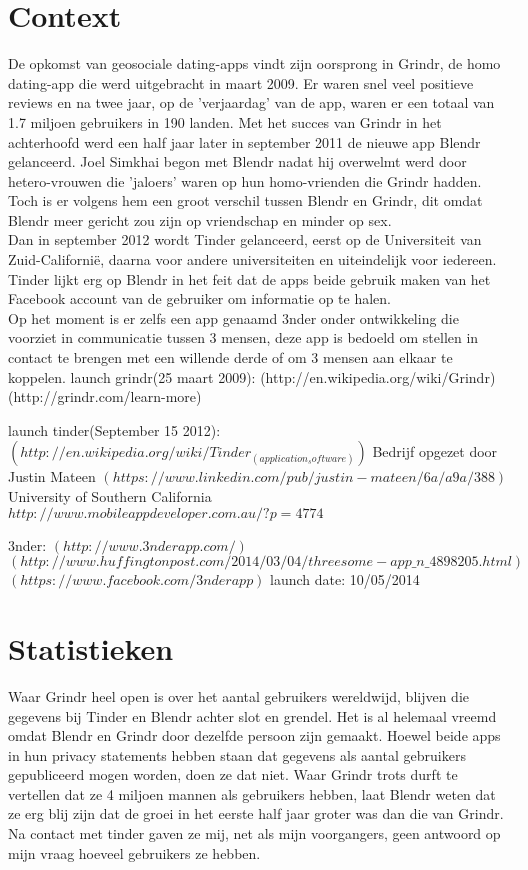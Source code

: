 \documentclass[pdftex,12pt,a4paper]{article}
\begin{document}


\section{Context}
De opkomst van geosociale dating-apps vindt zijn oorsprong in Grindr, de homo dating-app die werd uitgebracht in maart 2009. Er waren snel veel positieve reviews en na twee jaar, op de 'verjaardag' van de app, waren er een totaal van 1.7 miljoen gebruikers in 190 landen. Met het succes van Grindr in het achterhoofd werd een half jaar later in september 2011 de nieuwe app Blendr gelanceerd. Joel Simkhai begon met Blendr nadat hij overwelmt werd door hetero-vrouwen die 'jaloers' waren op hun homo-vrienden die Grindr hadden. Toch is er volgens hem een groot verschil tussen Blendr en Grindr, dit omdat Blendr meer gericht zou zijn op vriendschap en minder op sex.
\\

Dan in september 2012 wordt Tinder gelanceerd, eerst op de Universiteit van Zuid-Californië, daarna voor andere universiteiten en uiteindelijk voor iedereen. Tinder lijkt erg op Blendr in het feit dat de apps beide gebruik maken van het Facebook account van de gebruiker om informatie op te halen.
\\

Op het moment is er zelfs een app genaamd 3nder onder ontwikkeling die voorziet in communicatie tussen 3 mensen, deze app is bedoeld om stellen in contact te brengen met een willende derde of om 3 mensen aan elkaar te koppelen.
launch grindr(25 maart 2009):
(http://en.wikipedia.org/wiki/Grindr)
(http://grindr.com/learn-more)

launch tinder(September 15 2012):
$(http://en.wikipedia.org/wiki/Tinder_(application_software))$
Bedrijf opgezet door Justin Mateen $(https://www.linkedin.com/pub/justin-mateen/6a/a9a/388)$
University of Southern California
$http://www.mobileappdeveloper.com.au/?p=4774$

3nder:
$(http://www.3nderapp.com/)$
$(http://www.huffingtonpost.com/2014/03/04/threesome-app\_n\_4898205.html)$
$(https://www.facebook.com/3nderapp)$
launch date: 10/05/2014
\section{Statistieken}
Waar Grindr heel open is over het aantal gebruikers wereldwijd, blijven die gegevens bij Tinder en Blendr achter slot en grendel. Het is al helemaal vreemd omdat Blendr en Grindr door dezelfde persoon zijn gemaakt. Hoewel beide apps in hun privacy statements hebben staan dat gegevens als aantal gebruikers gepubliceerd mogen worden, doen ze dat niet. Waar Grindr trots durft te vertellen dat ze 4 miljoen mannen als gebruikers hebben, laat Blendr weten dat ze erg blij zijn dat de groei in het eerste half jaar groter was dan die van Grindr.\cite{creeped2013} Na contact met tinder gaven ze mij, net als mijn voorgangers, geen antwoord op mijn vraag hoeveel gebruikers ze hebben.
\end{document}

